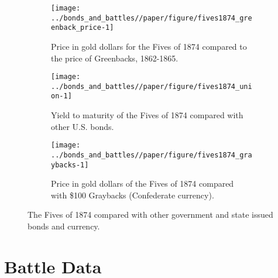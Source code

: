 \begin{figure}[!htpb]
  \begin{subfigure}[b]{0.45\linewidth}
    \texttt{[image: ../bonds\_and\_battles//paper/figure/fives1874\_greenback\_price-1]}
  \caption{Price in gold dollars for the Fives of 1874 compared to the price of Greenbacks, 1862-1865.}
  \label{bonds:fig:fives1874_greenbacks}
\end{subfigure}%
\hspace{0.1\linewidth}%
\begin{subfigure}[b]{0.45\linewidth}
    \texttt{[image: ../bonds\_and\_battles//paper/figure/fives1874\_union-1]}
    \caption{Yield to maturity of the Fives of 1874 compared with other U.S. bonds.}
  \label{bonds:fig:fives1874_union}
\end{subfigure}


\begin{subfigure}[b]{0.45\linewidth}
  \texttt{[image: ../bonds\_and\_battles//paper/figure/fives1874\_graybacks-1]}
\caption{Price in gold dollars of the Fives of 1874 compared with \$100 Graybacks (Confederate currency).}
\label{bonds:fig:fives1874_grayback}
\end{subfigure}
\caption[The Fives of 1874 compared with other government and state issued bonds and currency.]{The Fives of 1874 compared with other government and state issued bonds and currency.
}
\label{bonds:fig:fives1874_compared}
\end{figure}



\section{Battle Data}
\label{sec:battle-data}

